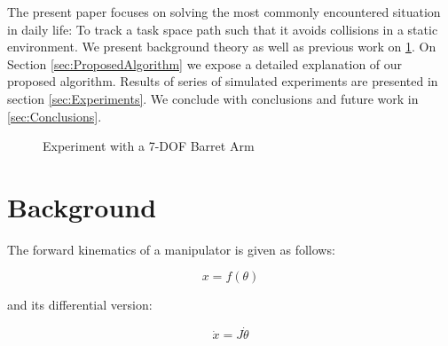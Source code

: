 \documentclass[conference]{IEEEtran}
\newcommand{\J}{ \ensuremath{J} }
\newcommand{\dq}{ \ensuremath{\dot{\theta}} }
\newcommand{\q}{ \ensuremath{\theta } }
\begin{document}
The present paper focuses on solving the most commonly encountered
situation in daily life: To track a task space path
such that it avoids collisions in a static
environment. We present background theory as well as previous work on \ref{sec:Background}. 
On Section \ref{sec:ProposedAlgorithm} we expose a detailed explanation of our proposed
algorithm. Results of series of simulated experiments are presented in section \ref{sec:Experiments}. 
We conclude with conclusions and future work in \ref{sec:Conclusions}.
\begin{figure}[]
  \centering
  \caption{ Experiment with a 7-DOF Barret Arm}
  \label{fig:CoverFigure}
\end{figure}


\section{Background}
\label{sec:Background}
The forward kinematics of a manipulator is given as follows:

\begin{equation}
x = f(\q)
\label{eq:FK}
\end{equation}

and its differential version:

\begin{equation}
\dot{x} = \J \dq
\label{eq:Diff_FK}
\end{equation}
\end{document}

